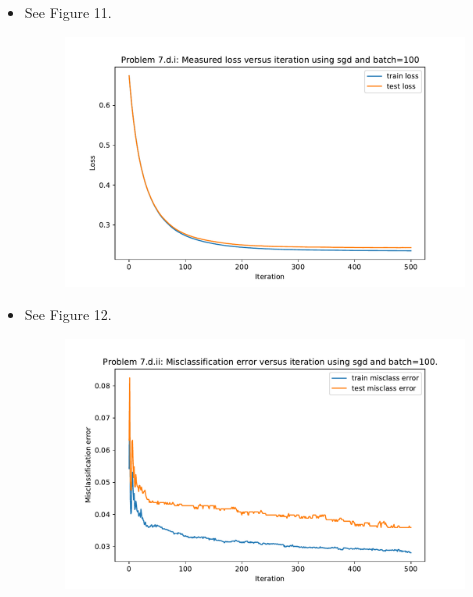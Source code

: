 \begin{itemize}
    \item See Figure 11. 
    \begin{figure}[h!]
	\centering
        \includegraphics[width=0.5\linewidth]{images/P7_d_i.pdf}
        \caption{}
    \end{figure}
    \item See Figure 12. 
    \begin{figure}[h!]
	\centering
        \includegraphics[width=0.5\linewidth]{images/P7_d_ii.pdf}
        \caption{}
    \end{figure}
\end{itemize}
